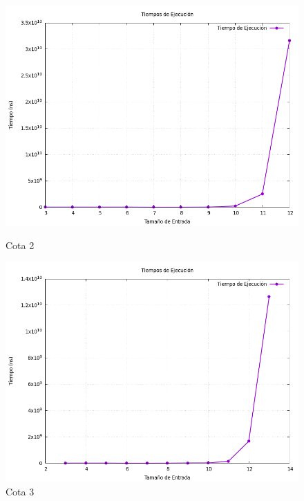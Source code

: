 \documentclass[11pt,openany]{book}
\begin{document}
\begin{figure}
    \begin{minipage}{.48\textwidth}
          \centering
          \includegraphics[width=1\linewidth]{assets/Img/grafico_tiempos2.png}
          \caption{Cota 2}
          \label{fig:Cota 2}
    \end{minipage}
\begin{minipage}{.48\textwidth}
      \centering
      \includegraphics[width=1\linewidth]{assets/Img/grafico_tiempos3.png}
      \caption{Cota 3}
      \label{fig:Cota 3}
\end{minipage}

\end{figure}
\end{document}
